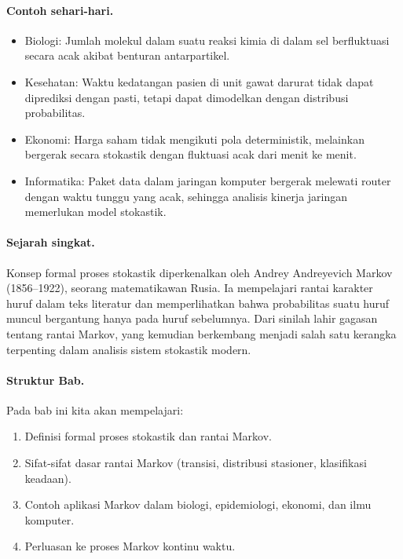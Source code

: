 \documentclass{bukumjh}
\begin{document}
\paragraph{Contoh sehari-hari.}
\begin{itemize}
    \item {\jsg Biologi:} Jumlah molekul dalam suatu reaksi kimia di dalam sel berfluktuasi secara acak akibat benturan antarpartikel.
    \item {\jsg Kesehatan:} Waktu kedatangan pasien di unit gawat darurat tidak dapat diprediksi dengan pasti, tetapi dapat dimodelkan dengan distribusi probabilitas.
    \item {\jsg Ekonomi:} Harga saham tidak mengikuti pola deterministik, melainkan bergerak secara stokastik dengan fluktuasi acak dari menit ke menit.
    \item {\jsg Informatika:} Paket data dalam jaringan komputer bergerak melewati router dengan waktu tunggu yang acak, sehingga analisis kinerja jaringan memerlukan model stokastik.
\end{itemize}

\paragraph{Sejarah singkat.}  
Konsep formal proses stokastik diperkenalkan oleh Andrey Andreyevich Markov (1856–1922), seorang matematikawan Rusia. Ia mempelajari rantai karakter huruf dalam teks literatur dan memperlihatkan bahwa probabilitas suatu huruf muncul bergantung hanya pada huruf sebelumnya. Dari sinilah lahir gagasan tentang {\jsg rantai Markov}, yang kemudian berkembang menjadi salah satu kerangka terpenting dalam analisis sistem stokastik modern.

\paragraph{Struktur Bab.}  
Pada bab ini kita akan mempelajari:
\begin{enumerate}
    \item Definisi formal proses stokastik dan rantai Markov.
    \item Sifat-sifat dasar rantai Markov (transisi, distribusi stasioner, klasifikasi keadaan).
    \item Contoh aplikasi Markov dalam biologi, epidemiologi, ekonomi, dan ilmu komputer.
    \item Perluasan ke proses Markov kontinu waktu.
\end{enumerate}
\end{document}
